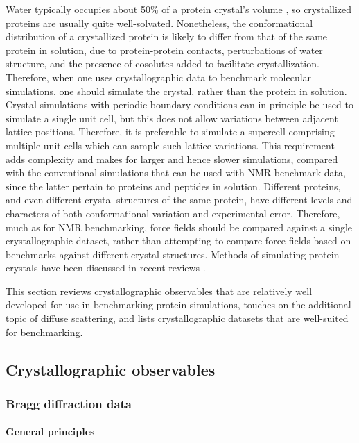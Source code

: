 \documentclass[9pt,review]{livecoms}
\begin{document}
Water typically occupies about 50\% of a protein crystal’s volume \cite{altan_learning_2018}, so crystallized proteins are usually quite well-solvated.
Nonetheless, the conformational distribution of a crystallized protein is likely to differ from that of the same protein in solution, due to protein-protein contacts, perturbations of water structure, and the presence of cosolutes added to facilitate crystallization.
Therefore, when one uses crystallographic data to benchmark molecular simulations, one should simulate the crystal, rather than the protein in solution.
Crystal simulations with periodic boundary conditions can in principle be used to simulate a single unit cell, but this does not allow variations between adjacent lattice positions.
Therefore, it is preferable to simulate a supercell comprising multiple unit cells which can sample such lattice variations.
This requirement adds complexity and makes for larger and hence slower simulations, compared with the conventional simulations that can be used with NMR benchmark data, since the latter pertain to proteins and peptides in solution.
Different proteins, and even different crystal structures of the same protein, have different levels and characters of both conformational variation and experimental error.
Therefore, much as for NMR benchmarking, force fields should be compared against a single crystallographic dataset, rather than attempting to compare force fields based on benchmarks against different crystal structures.
Methods of simulating protein crystals have been discussed in recent reviews \cite{cerutti_molecular_2019,wych_molecular-dynamics_2023}.

This section reviews crystallographic observables that are relatively well developed for use in benchmarking protein simulations, touches on the additional topic of diffuse scattering, and lists crystallographic datasets that are well-suited for benchmarking.

\subsection{Crystallographic observables}
\label{sub:xtal_obs}

\subsubsection{Bragg diffraction data}
\label{sub2:bragg}

\paragraph{General principles}
\end{document}
